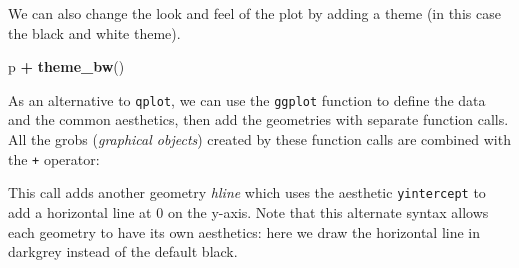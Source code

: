 \documentclass[
]{book}
\newenvironment{Shaded}{\begin{snugshade}}{\end{snugshade}}
\newcommand{\AttributeTok}[1]{\textcolor[rgb]{0.13,0.29,0.53}{#1}}
\newcommand{\DecValTok}[1]{\textcolor[rgb]{0.00,0.00,0.81}{#1}}
\newcommand{\FunctionTok}[1]{\textcolor[rgb]{0.13,0.29,0.53}{\textbf{#1}}}
\newcommand{\NormalTok}[1]{#1}
\newcommand{\OtherTok}[1]{\textcolor[rgb]{0.56,0.35,0.01}{#1}}
\newcommand{\SpecialCharTok}[1]{\textcolor[rgb]{0.81,0.36,0.00}{\textbf{#1}}}
\newcommand{\StringTok}[1]{\textcolor[rgb]{0.31,0.60,0.02}{#1}}
\begin{document}
We can also change the look and feel of the plot by adding a theme
(in this case the black and white theme).

\begin{Shaded}
\begin{Highlighting}[]
\NormalTok{p }\SpecialCharTok{+} \FunctionTok{theme\_bw}\NormalTok{()}
\end{Highlighting}
\end{Shaded}

As an alternative to \texttt{qplot}, we can use the \texttt{ggplot}
function to define the data and the common aesthetics, then add the
geometries with separate function calls. All the grobs (\emph{graphical objects})
created by these function calls are combined with the
\texttt{+} operator:

\begin{Shaded}
\end{Shaded}

This call adds another geometry \emph{hline} which uses the aesthetic
\texttt{yintercept} to add a horizontal line at 0 on the y-axis. Note
that this alternate syntax allows each geometry to have its own
aesthetics: here we draw the horizontal line in darkgrey instead of
the default black.
\end{document}
